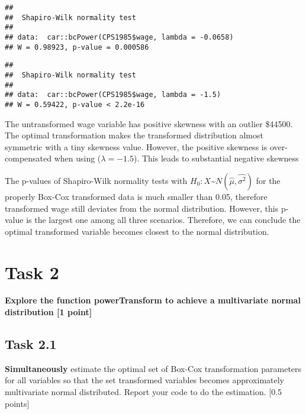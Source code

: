 \documentclass[
]{article}
\newenvironment{Shaded}{\begin{snugshade}}{\end{snugshade}}
\newcommand{\DataTypeTok}[1]{\textcolor[rgb]{0.13,0.29,0.53}{#1}}
\newcommand{\FloatTok}[1]{\textcolor[rgb]{0.00,0.00,0.81}{#1}}
\newcommand{\KeywordTok}[1]{\textcolor[rgb]{0.13,0.29,0.53}{\textbf{#1}}}
\newcommand{\NormalTok}[1]{#1}
\newcommand{\OperatorTok}[1]{\textcolor[rgb]{0.81,0.36,0.00}{\textbf{#1}}}
\begin{document}
\begin{verbatim}
## 
##  Shapiro-Wilk normality test
## 
## data:  car::bcPower(CPS1985$wage, lambda = -0.0658)
## W = 0.98923, p-value = 0.000586
\end{verbatim}

\begin{Shaded}
\end{Shaded}

\begin{verbatim}
## 
##  Shapiro-Wilk normality test
## 
## data:  car::bcPower(CPS1985$wage, lambda = -1.5)
## W = 0.59422, p-value < 2.2e-16
\end{verbatim}

The untransformed wage variable has positive skewness with an outlier
\$44500. The optimal transformation makes the transformed distribution
almost symmetric with a tiny skewness value. However, the positive
skewness is over-compensated when using (\(\lambda = -1.5\)). This leads
to substantial negative skewness

The p-values of Shapiro-Wilk normality tests with
\(H_0 : X\)\textasciitilde{}\(N(\hat{\mu},\hat{\sigma^2})\) for the
properly Box-Cox transformed data is much smaller than 0.05, therefore
transformed wage still deviates from the normal distribution. However,
this p-value is the largest one among all three scenarios. Therefore, we
can conclude the optimal transformed variable becomes closest to the
normal distribution.

\hypertarget{task-2}{%
\section{Task 2}\label{task-2}}

\textbf{Explore the function powerTransform to achieve a multivariate
normal distribution {[}1 point{]}}

\hypertarget{task-2.1}{%
\subsection{Task 2.1}\label{task-2.1}}

\textbf{Simultaneously} estimate the optimal set of Box-Cox
transformation parameters for all variables so that the set transformed
variables becomes approximately multivariate normal distributed. Report
your code to do the estimation. {[}0.5 points{]}
\end{document}
